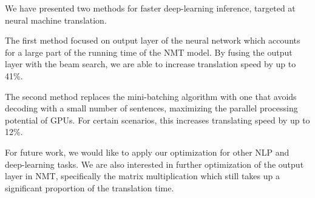 \documentclass[11pt,a4paper]{article}
\begin{document}
We have presented two methods for faster deep-learning inference, targeted at neural machine translation. 

The first method focused on output layer of the neural network which accounts for a large part of the running time of the NMT model. By fusing the output layer with the beam search, we are able to increase translation speed by up to 41\%.

The second method replaces the mini-batching algorithm with one that avoids decoding with a small number of sentences, maximizing the parallel processing potential of GPUs. For certain scenarios, this increases translating  speed by up to 12\%.

For future work, we would like to apply our optimization for other NLP and deep-learning tasks. We are also interested in further optimization of the output layer in NMT, specifically the matrix multiplication which still takes up a significant proportion of the translation time.




\end{document}
